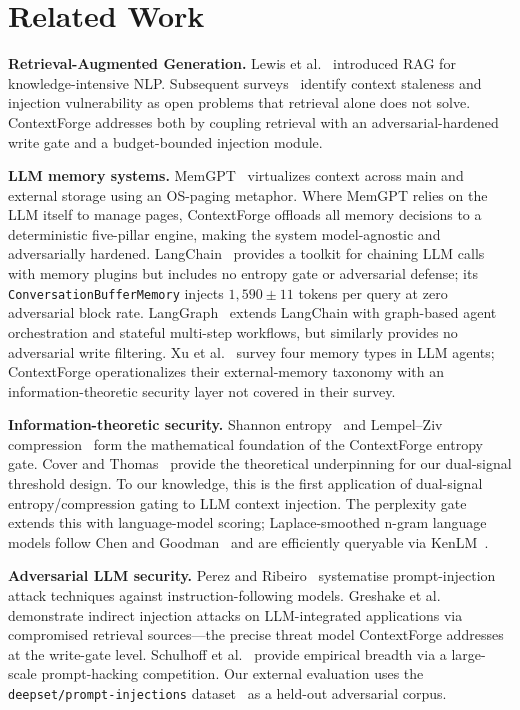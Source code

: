 \documentclass[11pt,twocolumn]{article}
\begin{document}
\section{Related Work}
\label{sec:related}

\textbf{Retrieval-Augmented Generation.}
Lewis et al.~\cite{lewis2020rag} introduced RAG for knowledge-intensive NLP.
Subsequent surveys~\cite{gao2023retrieval} identify context staleness and
injection vulnerability as open problems that retrieval alone does not solve.
ContextForge addresses both by coupling retrieval with an adversarial-hardened
write gate and a budget-bounded injection module.

\textbf{LLM memory systems.}
MemGPT~\cite{packer2023memgpt} virtualizes context across main and external
storage using an OS-paging metaphor. Where MemGPT relies on the LLM itself
to manage pages, ContextForge offloads all memory decisions to a deterministic
five-pillar engine, making the system model-agnostic and adversarially hardened.
LangChain~\cite{chase2022langchain} provides a toolkit for chaining LLM calls
with memory plugins but includes no entropy gate or adversarial defense;
its \texttt{ConversationBufferMemory} injects $1{,}590 \pm 11$ tokens per query
at zero adversarial block rate.
LangGraph~\cite{langgraph2024} extends LangChain with graph-based agent
orchestration and stateful multi-step workflows, but similarly provides no
adversarial write filtering.
Xu et al.~\cite{xu2023memory} survey four memory types in LLM agents;
ContextForge operationalizes their external-memory taxonomy with an
information-theoretic security layer not covered in their survey.

\textbf{Information-theoretic security.}
Shannon entropy~\cite{shannon1948} and Lempel--Ziv compression~\cite{ziv1977,ziv1978}
form the mathematical foundation of the ContextForge entropy gate.
Cover and Thomas~\cite{cover2006} provide the theoretical underpinning for
our dual-signal threshold design. To our knowledge, this is the first
application of dual-signal entropy/compression gating to LLM context injection.
The perplexity gate extends this with language-model scoring; Laplace-smoothed
n-gram language models follow Chen and Goodman~\cite{chen1999} and are
efficiently queryable via KenLM~\cite{heafield2011}.

\textbf{Adversarial LLM security.}
Perez and Ribeiro~\cite{perez2022ignore} systematise prompt-injection attack
techniques against instruction-following models. Greshake et al.~\cite{greshake2023not}
demonstrate indirect injection attacks on LLM-integrated applications via
compromised retrieval sources---the precise threat model ContextForge addresses
at the write-gate level. Schulhoff et al.~\cite{schulhoff2023hackaprompt} provide
empirical breadth via a large-scale prompt-hacking competition. Our external
evaluation uses the \texttt{deepset/prompt-injections} dataset~\cite{deepset2023injections}
as a held-out adversarial corpus.
\end{document}
